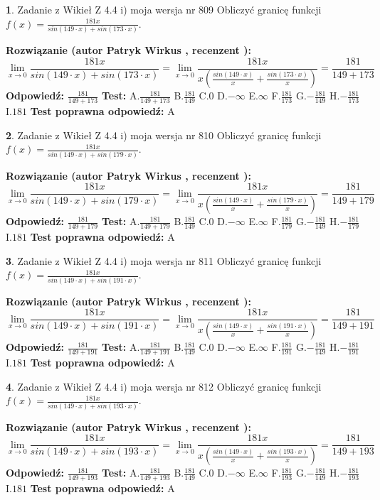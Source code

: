 \documentclass[12pt, a4paper]{article}
\theoremstyle{definition} %
\newtheorem{zad}{}
\newcommand{\zadStart}[1]{\begin{zad}#1\newline}
\newcommand{\zadStop}{\end{zad}}
\newcommand{\rozwStart}[2]{\noindent \textbf{Rozwiązanie (autor #1 , recenzent #2): }\newline}
\newcommand{\rozwStop}{\newline}
\newcommand{\odpStart}{\noindent \textbf{Odpowiedź:}\newline}
\newcommand{\odpStop}{\newline}
\newcommand{\testStart}{\noindent \textbf{Test:}\newline}
\newcommand{\testStop}{\newline}
\newcommand{\kluczStart}{\noindent \textbf{Test poprawna odpowiedź:}\newline}
\newcommand{\kluczStop}{\newline}
\begin{document}
\zadStart{Zadanie z Wikieł Z 4.4 i) moja wersja nr 809}
Obliczyć granicę funkcji $f(x)=\frac{181x}{sin(149\cdot x) +sin(173\cdot x)}$.
\zadStop
\rozwStart{Patryk Wirkus}{}
$$\lim\limits_{x\to 0}\frac{181x}{sin(149\cdot x) +sin(173\cdot x)}=\lim\limits_{x\to 0}\frac{181x}{x(\frac{sin(149\cdot x)}{x}+\frac{sin(173\cdot x)}{x})}=\frac{181}{149+173}$$
\rozwStop
\odpStart
$\frac{181}{149+173}$
\odpStop
\testStart
A.$\frac{181}{149+173}$
B.$\frac{181}{149}$
C.$0$
D.$-\infty$
E.$\infty$
F.$\frac{181}{173}$
G.$-\frac{181}{149}$
H.$-\frac{181}{173}$
I.$181$
\testStop
\kluczStart
A
\kluczStop



\zadStart{Zadanie z Wikieł Z 4.4 i) moja wersja nr 810}
Obliczyć granicę funkcji $f(x)=\frac{181x}{sin(149\cdot x) +sin(179\cdot x)}$.
\zadStop
\rozwStart{Patryk Wirkus}{}
$$\lim\limits_{x\to 0}\frac{181x}{sin(149\cdot x) +sin(179\cdot x)}=\lim\limits_{x\to 0}\frac{181x}{x(\frac{sin(149\cdot x)}{x}+\frac{sin(179\cdot x)}{x})}=\frac{181}{149+179}$$
\rozwStop
\odpStart
$\frac{181}{149+179}$
\odpStop
\testStart
A.$\frac{181}{149+179}$
B.$\frac{181}{149}$
C.$0$
D.$-\infty$
E.$\infty$
F.$\frac{181}{179}$
G.$-\frac{181}{149}$
H.$-\frac{181}{179}$
I.$181$
\testStop
\kluczStart
A
\kluczStop



\zadStart{Zadanie z Wikieł Z 4.4 i) moja wersja nr 811}
Obliczyć granicę funkcji $f(x)=\frac{181x}{sin(149\cdot x) +sin(191\cdot x)}$.
\zadStop
\rozwStart{Patryk Wirkus}{}
$$\lim\limits_{x\to 0}\frac{181x}{sin(149\cdot x) +sin(191\cdot x)}=\lim\limits_{x\to 0}\frac{181x}{x(\frac{sin(149\cdot x)}{x}+\frac{sin(191\cdot x)}{x})}=\frac{181}{149+191}$$
\rozwStop
\odpStart
$\frac{181}{149+191}$
\odpStop
\testStart
A.$\frac{181}{149+191}$
B.$\frac{181}{149}$
C.$0$
D.$-\infty$
E.$\infty$
F.$\frac{181}{191}$
G.$-\frac{181}{149}$
H.$-\frac{181}{191}$
I.$181$
\testStop
\kluczStart
A
\kluczStop



\zadStart{Zadanie z Wikieł Z 4.4 i) moja wersja nr 812}
Obliczyć granicę funkcji $f(x)=\frac{181x}{sin(149\cdot x) +sin(193\cdot x)}$.
\zadStop
\rozwStart{Patryk Wirkus}{}
$$\lim\limits_{x\to 0}\frac{181x}{sin(149\cdot x) +sin(193\cdot x)}=\lim\limits_{x\to 0}\frac{181x}{x(\frac{sin(149\cdot x)}{x}+\frac{sin(193\cdot x)}{x})}=\frac{181}{149+193}$$
\rozwStop
\odpStart
$\frac{181}{149+193}$
\odpStop
\testStart
A.$\frac{181}{149+193}$
B.$\frac{181}{149}$
C.$0$
D.$-\infty$
E.$\infty$
F.$\frac{181}{193}$
G.$-\frac{181}{149}$
H.$-\frac{181}{193}$
I.$181$
\testStop
\kluczStart
A
\kluczStop
\end{document}
